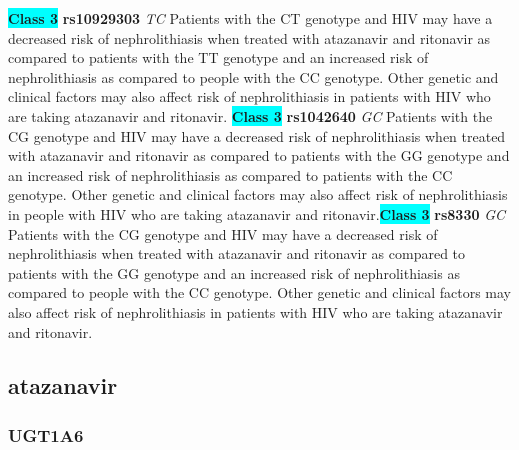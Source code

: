 \documentclass{book}
\begin{document}
\begin{center}
\textbf{\colorbox{cyan} {Class 3}} \textbf{ rs10929303 } \textit{ TC }
Patients with the CT genotype and HIV may have a decreased risk of nephrolithiasis when treated with atazanavir and ritonavir as compared to patients with the TT genotype and an increased risk of nephrolithiasis as compared to people with the CC genotype. Other genetic and clinical factors may also affect risk of nephrolithiasis in patients with HIV who are taking atazanavir and ritonavir. \textbf{\colorbox{cyan} {Class 3}} \textbf{ rs1042640 } \textit{ GC }
Patients with the CG genotype and HIV may have a decreased risk of nephrolithiasis when treated with atazanavir and ritonavir as compared to patients with the GG genotype and an increased risk of nephrolithiasis as compared to patients with the CC genotype. Other genetic and clinical factors may also affect risk of nephrolithiasis in people with HIV who are taking atazanavir and ritonavir.\textbf{\colorbox{cyan} {Class 3}} \textbf{ rs8330 } \textit{ GC }
Patients with the CG genotype and HIV may have a decreased risk of nephrolithiasis when treated with atazanavir and ritonavir as compared to patients with the GG genotype and an increased risk of nephrolithiasis as compared to people with the CC genotype. Other genetic and clinical factors may also affect risk of nephrolithiasis in patients with HIV who are taking atazanavir and ritonavir.


\end{center}\subsection{ atazanavir }


\subsubsection{ UGT1A6 }
\end{document}
